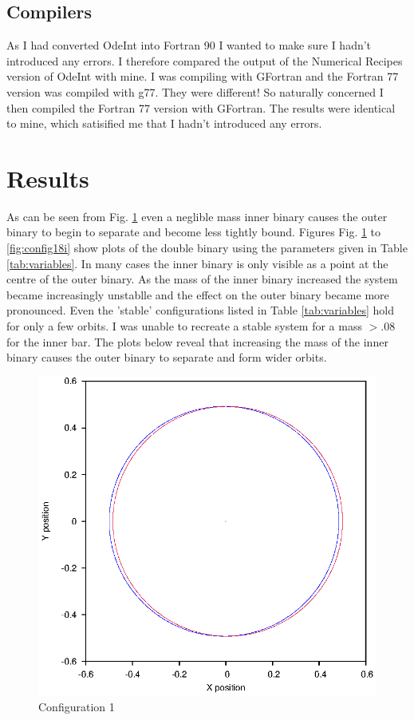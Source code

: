\documentclass[a4paper,12pt]{article}
\begin{document}
\subsection{Compilers}
As I had converted OdeInt into Fortran 90 I wanted to make sure I hadn't introduced any errors. I therefore compared the output of the Numerical Recipes
version of OdeInt with mine. I was compiling with GFortran and the Fortran 77 version was compiled with g77. They were different! So naturally concerned 
I then compiled the Fortran 77 version with GFortran. The results were identical to mine, which satisified me that I hadn't introduced any errors.

\section{Results}
As can be seen from Fig. \ref{fig:config1} even a neglible mass inner binary causes the outer binary to begin to separate and become less tightly bound.
Figures Fig. \ref{fig:config1} to \ref{fig:config18i} show plots of the double binary using the parameters given in Table \ref{tab:variables}.
In many cases the inner binary is only visible as a point at the centre of the outer binary.
As the mass of the inner binary increased the system became increasingly unstablle and the effect on the outer binary became more pronounced.
Even the 'stable' configurations listed in Table \ref{tab:variables} hold for only a few orbits.
I was unable to recreate a stable system for a mass $>.08$ for the inner bar.
The plots below reveal that increasing the mass of the inner binary causes the outer binary to separate and
form wider orbits.

\begin{figure}[H]
\centering
\includegraphics[width=.9\textwidth]{./2016results/stablebase/Orbit.eps}
\caption{Configuration 1}
\label{fig:config1}
\end{figure}
\end{document}
